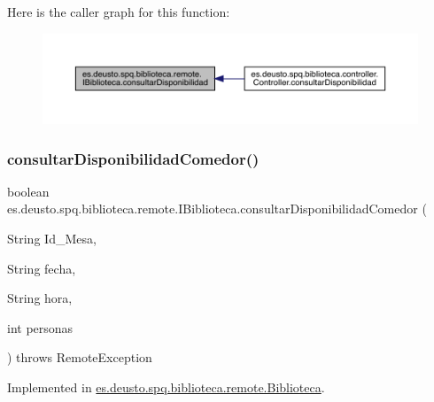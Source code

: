 Here is the caller graph for this function\+:
\nopagebreak
\begin{figure}[H]
\begin{center}
\leavevmode
\includegraphics[width=350pt]{interfacees_1_1deusto_1_1spq_1_1biblioteca_1_1remote_1_1_i_biblioteca_a96a133c2557486013949667cf0a14118_icgraph}
\end{center}
\end{figure}
\mbox{\label{interfacees_1_1deusto_1_1spq_1_1biblioteca_1_1remote_1_1_i_biblioteca_ab6188ebc7f0b5e23bdfc9e4a86395373}} 
\subsubsection{\texorpdfstring{consultar\+Disponibilidad\+Comedor()}{consultarDisponibilidadComedor()}}
{\footnotesize\ttfamily boolean es.\+deusto.\+spq.\+biblioteca.\+remote.\+I\+Biblioteca.\+consultar\+Disponibilidad\+Comedor (\begin{DoxyParamCaption}\item[{String}]{Id\+\_\+\+Mesa,  }\item[{String}]{fecha,  }\item[{String}]{hora,  }\item[{int}]{personas }\end{DoxyParamCaption}) throws Remote\+Exception}



Implemented in \mbox{\hyperlink{classes_1_1deusto_1_1spq_1_1biblioteca_1_1remote_1_1_biblioteca_af524e01768fc8aef0d3b3efd01f5c99f}{es.\+deusto.\+spq.\+biblioteca.\+remote.\+Biblioteca}}.


